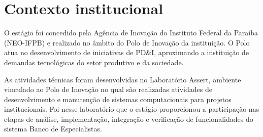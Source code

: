 \section{Contexto institucional}
\label{sec:contexto-institucional}

O estágio foi concedido pela Agência de Inovação do Instituto 
Federal da Paraíba (NEO-IFPB) e realizado no âmbito do Polo de 
Inovação da instituição. O Polo atua no desenvolvimento de iniciativas 
de PD\&I, aproximando a instituição de demandas tecnológicas do 
setor produtivo e da sociedade.

As atividades técnicas foram desenvolvidas no Laboratório Assert, 
ambiente vinculado ao Polo de Inovação no qual são realizadas 
atividades de desenvolvimento e manutenção de sistemas 
computacionais para projetos institucionais. Foi nesse 
laboratório que o estágio proporcionou a participação nas 
etapas de análise, implementação, integração e verificação de 
funcionalidades do sistema Banco de Especialistas.